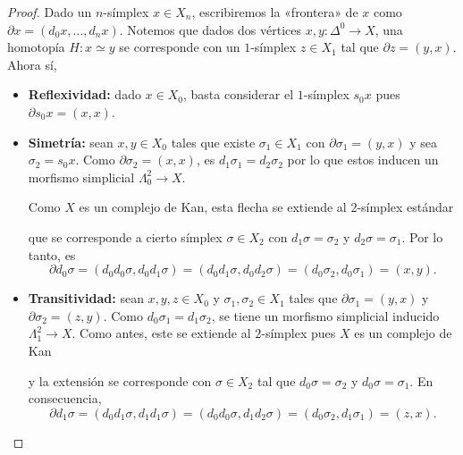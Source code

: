 \documentclass[11pt]{report}
\theoremstyle{colored}
\renewcommand{\ss}[1]{\Delta^{#1}}
\newcommand{\horn}[2]{\Lambda^{#1}_{#2}}
\newcommand{\guill}[1]{«#1»}
\begin{document}
\begin{proof} Dado un $n$-símplex $x \in X_n$, escribiremos la \guill{frontera} de $x$ como $\partial x = (d_0x,\dots,d_nx)$. Notemos que dados dos vértices $x,y : \ss{0} \to  X$, una homotopía $H : x \simeq y$ se corresponde con un $1$-símplex $z \in X_1$ tal que $\partial z = (y,x)$. Ahora sí, 
\begin{itemize}
\item \textbf{Reflexividad:} dado $x \in X_0$, basta considerar el $1$-símplex $s_0x$ pues $\partial s_0x = (x,x)$.
\item \textbf{Simetría:} sean $x,y \in X_0$ tales que existe $\sigma_1 \in X_1$ con $\partial \sigma_1 = (y,x)$ y sea $\sigma_2 = s_0x$. Como $\partial \sigma_2 = (x,x)$, es $d_1\sigma_1 = d_2\sigma_2$ por lo que estos inducen un morfismo simplicial $\horn{2}{0} \to X$. 

Como $X$ es un complejo de Kan, esta flecha se extiende al $2$-símplex estándar 
\begin{center}
\end{center}
que se corresponde a cierto símplex $\sigma \in X_2$ con $d_1\sigma = \sigma_2$ y $d_2\sigma = \sigma_1$. Por lo tanto, es
\[
\partial d_0\sigma = (d_0d_0\sigma,d_0d_1\sigma) = (d_0d_1\sigma,d_0d_2\sigma) = (d_0\sigma_2,d_0\sigma_1) = (x,y).
\]
\item \textbf{Transitividad:} sean $x,y,z \in X_0$ y $\sigma_1,\sigma_2 \in X_1$ tales que $\partial \sigma_1 = (y,x)$ y $\partial \sigma_2 = (z,y)$. Como $d_0\sigma_1 = d_1\sigma_2$, se tiene un morfismo simplicial inducido $\horn{2}{1} \to X$. Como antes, este se extiende al $2$-símplex pues $X$ es un complejo de Kan
\begin{center}
\end{center}
y la extensión se corresponde con $\sigma \in X_2$ tal que $d_0\sigma = \sigma_2$ y $d_0\sigma = \sigma_1$. En consecuencia,
\[
\partial d_1\sigma = (d_0d_1\sigma,d_1d_1\sigma) = (d_0d_0\sigma,d_1d_2\sigma) = (d_0\sigma_2,d_1\sigma_1) = (z,x).
\]
\end{itemize}
\end{proof}
\end{document}
